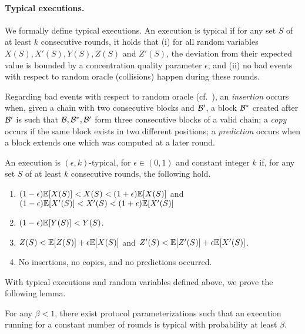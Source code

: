 \paragraph{Typical executions.}
%
We formally define typical executions.
%
An execution is typical if for any set $S$ of at least $k$ consecutive rounds, it holds that (i) for all random variables $X(S), X'(S), Y(S), Z(S)$ and $Z'(S)$, the deviation from their expected value is bounded by a concentration quality parameter $\epsilon$; and (ii) no bad events with respect to random oracle (collisions) happen during these rounds.

Regarding bad events with respect to random oracle (cf.~\cite{EPRINT:GarKiaLeo14}), an \emph{insertion} occurs when, given a chain \chain with two consecutive blocks \block and $\mathcal{B}'$, a block $\mathcal{B}^*$ created after $\mathcal{B}'$ is such that $\mathcal{B}, \mathcal{B}^*, \mathcal{B}'$ form three consecutive blocks of a valid chain; a \emph{copy} occurs if the same block exists in two different positions; a \emph{prediction} occurs when a block extends one which was computed at a later round.

\begin{definition}
    \label{def:typical-execution}

    An execution is $(\epsilon, k)$-typical, for $\epsilon \in (0, 1)$ and constant integer $k$ if, for any set $S$ of at least $k$ consecutive rounds, the following hold.
    \begin{enumerate}[label=(\alph*), leftmargin=*, nosep]
        \item $(1 - \epsilon) \mathbb{E}[X(S)] < X(S) < (1 + \epsilon) \mathbb{E}[X(S)]$ and $(1 - \epsilon) \mathbb{E}[X'(S)] < X'(S) < (1 + \epsilon) \mathbb{E}[X'(S)]$

        \item $(1 - \epsilon) \mathbb{E}[Y(S)] < Y(S)$.

        \item $Z(S) < \mathbb{E}[Z(S)] + \epsilon \mathbb{E}[X(S)]$ and $Z'(S) < \mathbb{E}[Z'(S)] + \epsilon \mathbb{E}[X'(S)]$.

        \item No insertions, no copies, and no predictions occurred.
    \end{enumerate}
\end{definition}

With typical executions and random variables defined above, we prove the following lemma.

\begin{lemma} \label{lemma:typical-execution-single-chain}
    For any $\beta < 1$, there exist protocol parameterizations such that an execution running for a constant number \phaseLength of rounds is typical with probability at least $\beta$.
\end{lemma}

